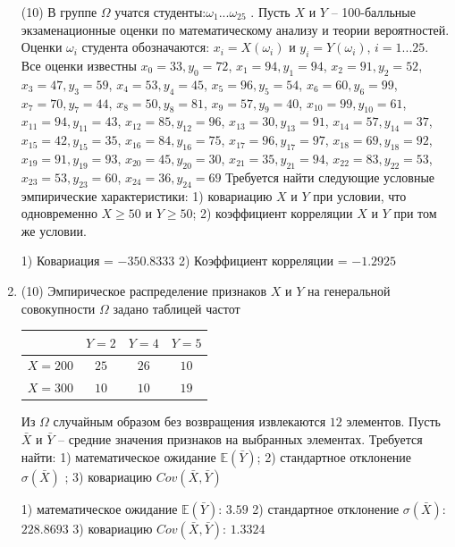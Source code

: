\documentclass[a4paper,14pt]{article}
\begin{document}
\begin{enumerate}
(10) В группе $\Omega$ учатся студенты:$\omega _{1}...\omega _{25}$ . Пусть $X$ и $Y$ – 100-балльные экзаменационные оценки по
математическому анализу и теории вероятностей. Оценки $\omega _{i}$ студента обозначаются: $x _{i} = X(\omega _{i})$ и $y _{i} = Y(\omega _{i})$, $i = 1...25$. Все оценки известны
$x _{0} = 33, y _{0} = 72$, $x _{1} = 94, y _{1} = 94$, $x _{2} = 91, y _{2} = 52$, $x _{3} = 47, y _{3} = 59$, $x _{4} = 53, y _{4} = 45$, $x _{5} = 96, y _{5} = 54$, $x _{6} = 60, y _{6} = 99$, $x _{7} = 70, y _{7} = 44$, $x _{8} = 50, y _{8} = 81$, $x _{9} = 57, y _{9} = 40$, $x _{10} = 99, y _{10} = 61$, $x _{11} = 94, y _{11} = 43$, $x _{12} = 85, y _{12} = 96$, $x _{13} = 30, y _{13} = 91$, $x _{14} = 57, y _{14} = 37$, $x _{15} = 42, y _{15} = 35$, $x _{16} = 84, y _{16} = 75$, $x _{17} = 96, y _{17} = 97$, $x _{18} = 69, y _{18} = 92$, $x _{19} = 91, y _{19} = 93$, $x _{20} = 45, y _{20} = 30$, $x _{21} = 35, y _{21} = 94$, $x _{22} = 83, y _{22} = 53$, $x _{23} = 53, y _{23} = 60$, $x _{24} = 36, y _{24} = 69$
Требуется
найти следующие условные эмпирические характеристики: 1) ковариацию $X$ и $Y$ при условии, что одновременно $X \geqslant 50$
 и $Y \geqslant 50$; 2) коэффициент корреляции $X$ и $Y$ при том же условии.




1) Ковариация = $-350.8333$
2) Коэффициент корреляции = $-1.2925$


\item


(10) Эмпирическое распределение признаков $X$ и $Y$ на генеральной совокупности $\Omega$ задано таблицей частот  
 
\begin{tabular}{ | c | c | c | c | }
\hline
 & $Y = 2$ & $Y = 4$ & $Y = 5$  \\ \hline
$X = 200$ & $25$ & $26$ & $10$\\ \hline
$X = 300$ & $10$ & $10$ & $19$\\
\hline
\end{tabular}

Из $\Omega$ случайным образом без возвращения извлекаются $12$ элементов. 
Пусть $\bar X$ и $\bar Y$ – средние значения признаков на выбранных элементах. 
Требуется найти: 1) математическое ожидание $\mathbb{E}(\bar Y)$; 2) стандартное отклонение $\sigma(\bar X)$ ; 
3) ковариацию $Cov(\bar X, \bar Y)$




1) математическое ожидание $\mathbb{E}(\bar Y)$: $3.59$ 
2) стандартное отклонение $\sigma(\bar X)$: $228.8693$
3) ковариацию $Cov(\bar X, \bar Y)$: $1.3324$



\end{enumerate}
\end{document}
